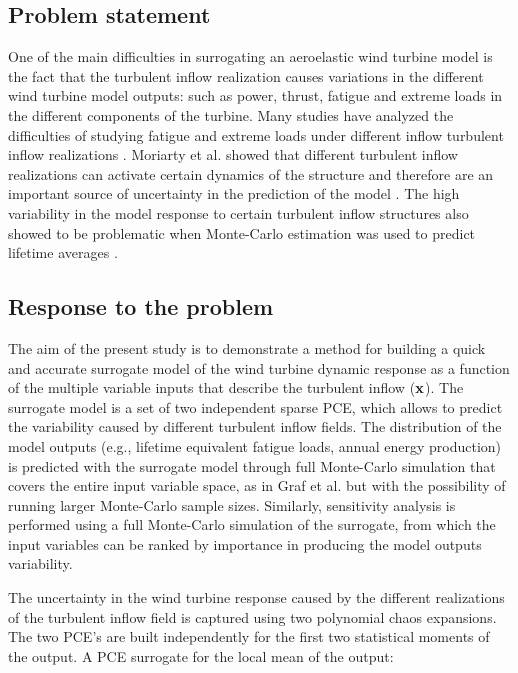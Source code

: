 \documentclass[preprint,12pt]{elsarticle}
\begin{document}
\subsection{Problem statement}
One of the main difficulties in surrogating an aeroelastic wind turbine model is the fact that the turbulent inflow realization causes variations in the different wind turbine model outputs: such as power, thrust, fatigue and extreme loads in the different components of the turbine. Many studies have analyzed the difficulties of studying fatigue and extreme loads under different inflow turbulent inflow realizations \cite{moriarty2008database, natarajan2012outlier, tibaldi2014investigation, abdallah2016influence, toft2016assessment}. Moriarty et al. showed that different turbulent inflow realizations can activate certain dynamics of the structure and therefore are an important source of uncertainty in the prediction of the model \cite{moriarty2008database}. The high variability in the model response to certain turbulent inflow structures also showed to be problematic when Monte-Carlo estimation was used to predict lifetime averages \cite{graf2015high}.


\subsection{Response to the problem}
The aim of the present study is to demonstrate a method for building a quick and accurate surrogate model of the wind turbine dynamic response as a function of the multiple variable inputs that describe the turbulent inflow ($\mathbf{x}$). The surrogate model is a set of two independent sparse PCE, which allows to predict the variability caused by different turbulent inflow fields. The distribution of the model outputs (e.g., lifetime equivalent fatigue loads, annual energy production) is predicted with the surrogate model through full Monte-Carlo simulation that covers the entire input variable space, as in Graf et al. \cite{graf2015high} but with the possibility of running larger Monte-Carlo sample sizes. Similarly, sensitivity analysis is performed using a full Monte-Carlo simulation of the surrogate, from which the input variables can be ranked by importance in producing the model outputs variability.

The uncertainty in the wind turbine response caused by the different realizations of the turbulent inflow field is captured using two polynomial chaos expansions. The two PCE's are built independently for the first two statistical moments of the output. A PCE surrogate for the local mean of the output:
\end{document}
